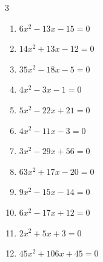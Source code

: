 \begin{multicols}{3}
\begin{enumerate}
\columnbreak %

  \item $6x^{2}-13x-15=0$


  \item $14x^{2}+13x-12=0$


  \item $35x^{2}-18x-5=0$


  \item $4x^{2}-3x-1=0$


  \item $5x^{2}-22x+21=0$


  \item $4x^{2}-11x-3=0$


  \item $3x^{2}-29x+56=0$


  \item $63x^{2}+17x-20=0$


  \item $9x^{2}-15x-14=0$


  \item $6x^{2}-17x+12=0$


\columnbreak %

  \item $2x^{2}+5x+3=0$


  \item $45x^{2}+106x+45=0$



\end{enumerate}
\end{multicols}
